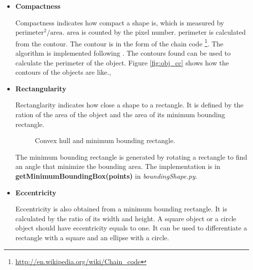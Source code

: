 \documentclass[paper=a4, fontsize=11pt]{scrartcl}
\begin{document}
\begin{itemize}
\item \textbf{Compactness} 

Compactness indicates how compact a shape is, which is measured by $ \mbox{perimeter}^{2} / \mbox{area} $.
$ \mbox{area} $ is counted by the pixel number.
$ \mbox{perimeter} $ is calculated from the contour. 
The contour is in the form of the chain code \footnote{\url{http://en.wikipedia.org/wiki/Chain_code}}. 
The algorithm is implemented following \cite{chaincode}.
The contours found can be used to calculate the perimeter of the object.
Figure \ref{fig:obj_cc} shows how the contours of the objects are like.,

\item \textbf{Rectangularity} 

Rectanglarity indicates how close a shape to a rectangle.
It is defined by the ration of the area of the object and the area of its minimum bounding rectangle.

\begin{figure}[h]
\centering
{} 
\caption{Convex hull and minimum bounding rectangle.}
\label{fig:convex_hull_min_bound_box}
\end{figure}

The minimum bounding rectangle is generated by rotating a rectangle to find an angle that minimize the bounding area.
The implementation is in \textbf{ getMinimumBoundingBox(points) } in \emph{boundingShape.py}.

\item \textbf{Eccentricity}

Eccentricity is also obtained from a minimum bounding rectangle.
It is calculated by the ratio of its width and height.
A square object or a circle object should have eccentricity equals to one.
It can be used to differentiate a rectangle with a square and an ellipse with a circle.


\end{itemize}
\end{document}
